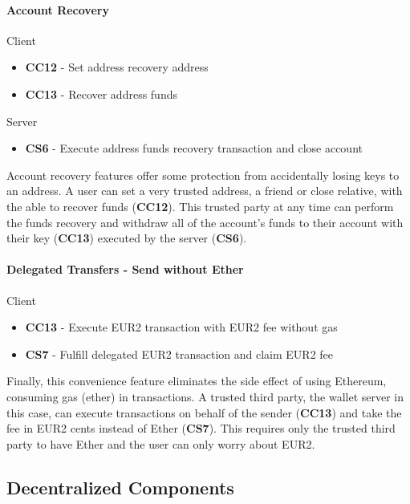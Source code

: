 \documentclass[a4paper,12pt]{article} %
\begin{document}
{{\paragraph{Account Recovery}

Client
\begin{itemize}
	\item \textbf{CC12} - Set address recovery address
	\item \textbf{CC13} - Recover address funds
\end{itemize}

Server
\begin{itemize}
	\item \textbf{CS6} - Execute address funds recovery transaction and close account
\end{itemize}

Account recovery features offer some protection from accidentally losing keys to an address. A user can set a very trusted address, a friend or close relative, with the able to recover funds (\textbf{CC12}). This trusted party at any time can perform the funds recovery and withdraw all of the account's funds to their account with their key (\textbf{CC13}) executed by the server (\textbf{CS6}).

\paragraph{Delegated Transfers - Send without Ether}

Client
\begin{itemize}
	\item \textbf{CC13} - Execute EUR2 transaction with EUR2 fee without gas
\end{itemize}

\begin{itemize}
	\item \textbf{CS7} - Fulfill delegated EUR2 transaction and claim EUR2 fee
\end{itemize}

Finally, this convenience feature eliminates the side effect of using Ethereum, consuming gas (ether) in transactions. A trusted third party, the wallet server in this case, can execute transactions on behalf of the sender (\textbf{CC13}) and take the fee in EUR2 cents instead of Ether (\textbf{CS7}). This requires only the trusted third party to have Ether and the user can only worry about EUR2.

\subsection{Decentralized Components} \label{ssec:3.4}

}}
\end{document}
